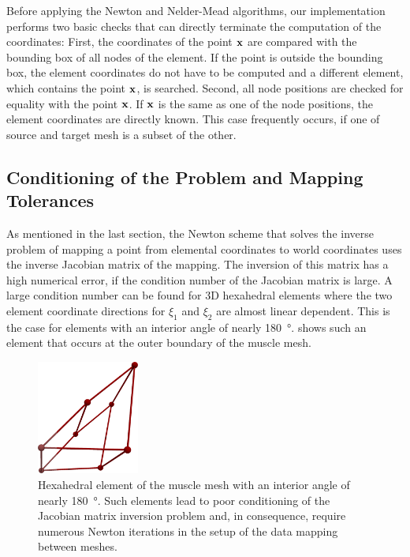 Before applying the Newton and Nelder-Mead algorithms, our implementation performs two basic checks that can directly terminate the computation of the coordinates: First, the coordinates of the point $\textbf{x}$ are compared with the bounding box of all nodes of the element. If the point is outside the bounding box, the element coordinates do not have to be computed and a different element, which contains the point $\textbf{x}$, is searched. Second, all node positions are checked for equality with the point $\textbf{x}$. If $\textbf{x}$ is the same as one of the node positions, the element coordinates are directly known. This case frequently occurs, if one of source and target mesh is a subset of the other.

\subsection{Conditioning of the Problem and Mapping Tolerances}

As mentioned in the last section, the Newton scheme that solves the inverse problem of mapping a point from elemental coordinates to world coordinates uses the inverse Jacobian matrix of the mapping. The inversion of this matrix has a high numerical error, if the condition number of the Jacobian matrix is large. A large condition number can be found for 3D hexahedral elements where the two element coordinate directions for $\xi_1$ and $\xi_2$ are almost linear dependent. This is the case for elements with an interior angle of nearly \SI{180}{\degree}.  shows such an element that occurs at the outer boundary of the muscle mesh.

\begin{figure}%
  \centering%
  \includegraphics[width=0.3\textwidth]{images/implementation/bad_element2.png}%
  \caption{Hexahedral element of the muscle mesh with an interior angle of nearly \SI{180}{\degree}. Such elements lead to poor conditioning of the Jacobian matrix inversion problem and, in consequence, require numerous Newton iterations in the setup of the data mapping between meshes.}%
  \label{fig:bad_element}%
\end{figure}%

